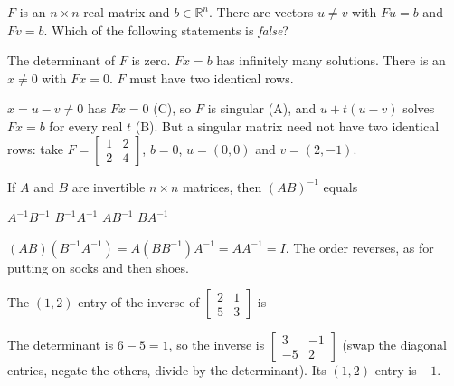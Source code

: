 \begin{question}[id=gate-cs2006-1, source=GATE CS 2006, marks=2]
$F$ is an $n \times n$ real matrix and $b \in \mathbb{R}^n$. There are vectors $u \ne v$ with $Fu = b$ and $Fv = b$. Which of the following statements is \emph{false}?
\begin{options}
  \option The determinant of $F$ is zero.
  \option $Fx = b$ has infinitely many solutions.
  \option There is an $x \ne 0$ with $Fx = 0$.
  \correct $F$ must have two identical rows.
\end{options}
\begin{solution}
$x = u - v \ne 0$ has $Fx = 0$ (C), so $F$ is singular (A), and $u + t(u - v)$ solves $Fx = b$ for every real $t$ (B). But a singular matrix need not have two identical rows: take $F = \begin{bmatrix} 1 & 2 \\ 2 & 4 \end{bmatrix}$, $b = 0$, $u = (0, 0)$ and $v = (2, -1)$.
\end{solution}
\end{question}


\begin{question}[id=mat-1]
If $A$ and $B$ are invertible $n \times n$ matrices, then $(AB)^{-1}$ equals
\begin{options}
  \option $A^{-1}B^{-1}$
  \correct $B^{-1}A^{-1}$
  \option $AB^{-1}$
  \option $BA^{-1}$
\end{options}
\begin{solution}
$(AB)(B^{-1}A^{-1}) = A(BB^{-1})A^{-1} = AA^{-1} = I$. The order reverses, as for putting on socks and then shoes.
\end{solution}
\end{question}

\begin{question}[id=mat-2]
The $(1,2)$ entry of the inverse of $\begin{bmatrix} 2 & 1 \\ 5 & 3 \end{bmatrix}$ is
\begin{solution}
The determinant is $6 - 5 = 1$, so the inverse is $\begin{bmatrix} 3 & -1 \\ -5 & 2 \end{bmatrix}$ (swap the diagonal entries, negate the others, divide by the determinant). Its $(1,2)$ entry is $-1$.
\end{solution}
\end{question}

